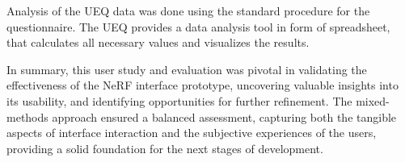 Analysis of the UEQ data was done using the standard procedure for the questionnaire.
The UEQ provides a data analysis tool in form of spreadsheet, that calculates all necessary values and visualizes the results.

In summary, this user study and evaluation was pivotal in validating the effectiveness of the NeRF interface prototype, uncovering valuable insights into its usability, and identifying opportunities for further refinement. 
The mixed-methods approach ensured a balanced assessment, capturing both the tangible aspects of interface interaction and the subjective experiences of the users, providing a solid foundation for the next stages of development.
